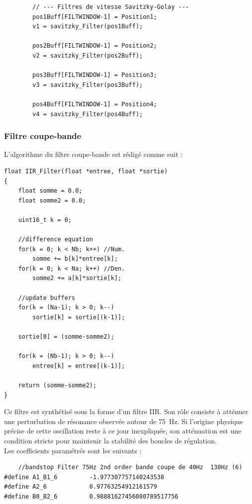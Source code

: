 \begin{verbatim}
        // --- Filtres de vitesse Savitzky-Golay ---
        pos1Buff[FILTWINDOW-1] = Position1;
        v1 = savitzky_Filter(pos1Buff);

        pos2Buff[FILTWINDOW-1] = Position2;
        v2 = savitzky_Filter(pos2Buff);

        pos3Buff[FILTWINDOW-1] = Position3;
        v3 = savitzky_Filter(pos3Buff);

        pos4Buff[FILTWINDOW-1] = Position4;
        v4 = savitzky_Filter(pos4Buff);
\end{verbatim}

\subsubsection{Filtre coupe-bande}
L'algorithme du filtre coupe-bande est rédigé comme suit :

\begin{verbatim}
float IIR_Filter(float *entree, float *sortie)
{
    float somme = 0.0;
    float somme2 = 0.0;

    uint16_t k = 0;

    //difference equation
    for(k = 0; k < Nb; k++) //Num.
        somme += b[k]*entree[k];
    for(k = 0; k < Na; k++) //Den.
        somme2 += a[k]*sortie[k];

    //update buffers
    for(k = (Na-1); k > 0; k--)
        sortie[k] = sortie[(k-1)];

    sortie[0] = (somme-somme2);

    for(k = (Nb-1); k > 0; k--)
        entree[k] = entree[(k-1)];

    return (somme-somme2);
}
\end{verbatim}

Ce filtre est synthétisé sous la forme d'un filtre IIR. Son rôle consiste à atténuer une perturbation de résonance observée autour de 75~Hz. Si l'origine physique précise de cette oscillation reste à ce jour inexpliquée, son atténuation est une condition stricte pour maintenir la stabilité des boucles de régulation.\\

Les coefficients paramétrés sont les suivants :

\begin{verbatim}
    //bandstop Filter 75Hz 2nd order bande coupe de 40Hz  130Hz (6)
#define A1_B1_6         -1.977307757140243538
#define A2_6            0.97763254912161579
#define B0_B2_6         0.98881627456080789517756
\end{verbatim}

